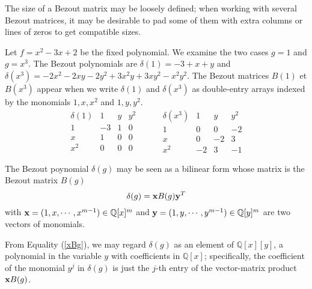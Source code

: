 \documentclass{standalone}
\begin{document}
\begin{rem}
\begin{rem}
The size of a Bezout matrix may be loosely defined; when working with several Bezout matrices, it may be desirable to pad some of them with extra columns or lines of zeros to get compatible sizes.
\end{rem}

\begin{exmp}
\label{exmp_1}
Let $f = x^2 - 3x + 2$ be the fixed polynomial. We examine the two cases $g=1$ and $g = x^3$. The Bezout polynomials are $\delta(1) = -3 + x + y$ and $\delta(x^3) = -2x^2 - 2xy -2y^2 + 3x^2y + 3xy^2 -x^2y^2$. The Bezout matrices $B(1)$ et $B(x^3)$ appear when we write  $\delta(1)$ and  $\delta(x^3)$ as double-entry arrays indexed by the monomials $1, x, x^2$ and $1, y, y^2$.
$$
\begin{array}{c|ccc}
\delta(1) & 1 & y & y^2\\
\hline
1 & -3 & 1 & 0\\
x & 1 & 0 & 0\\
x^2 & 0 & 0 & 0
\end{array}
\hspace{1cm}
\begin{array}{c|ccc}
\delta(x^3) & 1 & y & y^2\\
\hline
1 & 0 & 0 & -2\\
x & 0 & -2 & 3\\
x^2 & -2 & 3 & -1
\end{array}
$$
\end{exmp}
\begin{rem}
The Bezout poynomial $\delta(g)$ may be seen as a bilinear form whose matrix is the Bezout matrix $B(g)$
\begin{equation}
	\label{xBg}
	\delta(g) = \bold{x} B(g) \bold{y}^T
\end{equation}
with $\bold{x} = (1, x,\cdots, x^{m-1}) \in \mathbb{Q}[x]^m$ and $\bold{y} = (1, y,\cdots, y^{m-1}) \in \mathbb{Q}[y]^m$ are two vectors of monomials.
\end{rem}
From Equality (\ref{xBg}), we may regard $\delta(g)$ as an element of $\mathbb{Q}[x][y]$, a polynomial in the variable $y$ with coefficients in $\mathbb{Q}[x]$; specifically, the coefficient of the monomial $y^j$ in $\delta(g)$ is just the $j$-th entry of the vector-matrix product $\bold{x} B(g)$.





\end{rem}
\end{document}
